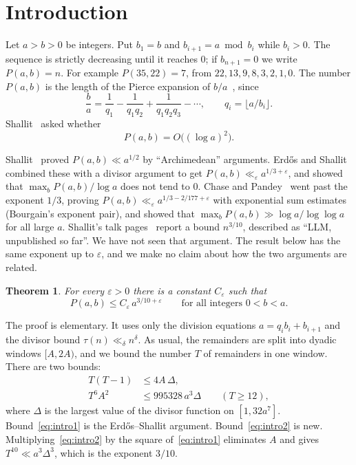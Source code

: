 \documentclass[11pt]{amsart}
\newtheorem{theorem}{Theorem}[section]
\theoremstyle{definition}
\theoremstyle{remark}
\begin{document}
\section{Introduction}\label{sec:intro}

Let $a>b>0$ be integers. Put $b_1=b$ and $b_{i+1}=a \bmod b_i$ while $b_i>0$. The sequence is
strictly decreasing until it reaches $0$; if $b_{n+1}=0$ we write $P(a,b)=n$. For example
$P(35,22)=7$, from $22,13,9,8,3,2,1,0$. The number $P(a,b)$ is the length of the Pierce
expansion of $b/a$~\cite{Pierce,Shallit86}, since
\[
\frac ba=\frac1{q_1}-\frac1{q_1q_2}+\frac1{q_1q_2q_3}-\cdots,\qquad q_i=\lfloor a/b_i\rfloor .
\]
Shallit~\cite{OPG} asked whether
\begin{equation}\label{eq:conj}
P(a,b)=O\bigl((\log a)^2\bigr).
\end{equation}

Shallit~\cite{Shallit86} proved $P(a,b)\ll a^{1/2}$ by ``Archimedean'' arguments.
Erd\H{o}s and Shallit~\cite{ES} combined these with a divisor argument to get
$P(a,b)\ll_\varepsilon a^{1/3+\varepsilon}$, and showed that $\max_b P(a,b)/\log a$ does not
tend to $0$. Chase and Pandey~\cite{CP} went past the exponent $1/3$, proving
$P(a,b)\ll_\varepsilon a^{1/3-2/177+\varepsilon}$ with exponential sum estimates
(Bourgain's exponent pair), and showed that $\max_b P(a,b)\gg \log a/\log\log a$ for all large
$a$. Shallit's talk pages~\cite{ShallitTalks} report a bound $n^{3/10}$, described as
``LLM, unpublished so far''. We have not seen that argument. The result below has the same
exponent up to $\varepsilon$, and we make no claim about how the two arguments are related.

\begin{theorem}\label{thm:main}
For every $\varepsilon>0$ there is a constant $C_\varepsilon$ such that
\[
P(a,b)\le C_\varepsilon\, a^{3/10+\varepsilon}\qquad\text{for all integers }0<b<a .
\]
\end{theorem}

The proof is elementary. It uses only the division equations
$a=q_ib_i+b_{i+1}$ and the divisor bound $\tau(n)\ll_\delta n^\delta$. As usual, the remainders
are split into dyadic windows $[A,2A)$, and we bound the number $T$ of remainders in one
window. There are two bounds:
\begin{align}
T(T-1)&\le 4A\,\Delta, \label{eq:intro1}\\
T^6A^2&\le 995328\, a^3\Delta \qquad(T\ge 12), \label{eq:intro2}
\end{align}
where $\Delta$ is the largest value of the divisor function on $[1,32a^7]$.
Bound~\eqref{eq:intro1} is the Erd\H{o}s--Shallit argument. Bound~\eqref{eq:intro2} is new.
Multiplying~\eqref{eq:intro2} by the square of~\eqref{eq:intro1} eliminates $A$ and gives
$T^{10}\ll a^3\Delta^3$, which is the exponent $3/10$.
\end{document}
